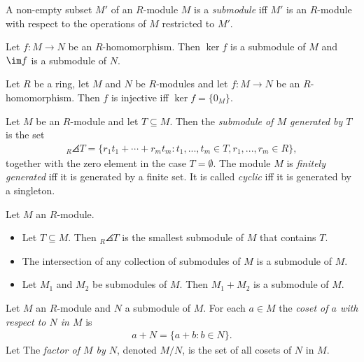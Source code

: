 \documentclass{article}
\begin{document}
\begin{definition}
	A non-empty subset $M'$ of an $R$-module $M$ is a \emph{submodule} iff $M'$ is an
	$R$-module with respect to the operations of $M$ restricted to $M'$.
\end{definition}

\begin{lemma}[Lemma 3.7.21]
	Let $f:M\to N$ be an $R$-homomorphism. Then $\ker f$ is a submodule of $M$ and $\im f$
	is a submodule of $N$.
\end{lemma}

\begin{lemma}[Lemma 3.7.22]
	Let $R$ be a ring, let $M$ and $N$ be $R$-modules and let $f:M\to N$ be an $R$-homomorphism.
	Then $f$ is injective iff $\ker f =\{0_M\}$.
\end{lemma}

\begin{definition}
	Let $M$ be an $R$-module and let $T\subseteq M$. Then the \emph{submodule of $M$ generated by $T$}
	is the set
	\begin{align*}
		_R\angles T = \{r_1t_1+\cdots+r_mt_m:t_1,...,t_m\in T,r_1,...,r_m\in R\},
	\end{align*}
	together with the zero element in the case $T=\emptyset$. The module $M$ is \emph{finitely generated}
	iff it is generated by a finite set. It is called \emph{cyclic} iff it is generated by a singleton.
\end{definition}

\begin{lemma}[Lemma 3.7.28-30]
	Let $M$ an $R$-module.
	\begin{itemize}
		\item Let $T\subseteq M$. Then $_R\angles T$ is the smallest submodule of $M$ that contains $T$.
		\item The intersection of any collection of submodules of $M$ is a submodule of $M$.
		\item Let $M_1$ and $M_2$ be submodules of $M$. Then $M_1+M_2$ is a submodule of $M$.
	\end{itemize}
\end{lemma}

\begin{definition}
	Let $M$ an $R$-module and $N$ a submodule of $M$. For each $a\in M$ the \emph{coset of $a$ with
		respect to $N$ in $M$} is
	\begin{align*}
		a+N=\{a+b:b\in N\}.
	\end{align*}
	Let
	The \emph{factor of $M$ by $N$}, denoted $M/N$, is the set of all cosets of $N$ in $M$.
\end{definition}
\end{document}
